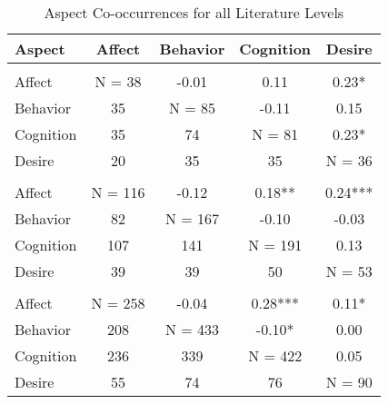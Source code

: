 \begin{table}
\begin{minipage}[t][\textheight][t]{\textwidth}

\caption{\label{tab:CombinedCooccurrences}Aspect Co-occurrences for all Literature Levels}
\begin{tabular}[t]{lcccc}
\toprule
Aspect & Affect & Behavior & Cognition & Desire\\
\midrule
\addlinespace[0.3em]
\multicolumn{5}{l}{\textbf{Theoretical}}\\
\hspace{1em}Affect & N = 38 & -0.01 & 0.11 & 0.23*\\
\hspace{1em}Behavior & 35 & N = 85 & -0.11 & 0.15\\
\hspace{1em}Cognition & 35 & 74 & N = 81 & 0.23*\\
\hspace{1em}Desire & 20 & 35 & 35 & N = 36\\
\addlinespace[0.3em]
\multicolumn{5}{l}{\textbf{Methodological}}\\
\hspace{1em}Affect & N = 116 & -0.12 & 0.18** & 0.24***\\
\hspace{1em}Behavior & 82 & N = 167 & -0.10 & -0.03\\
\hspace{1em}Cognition & 107 & 141 & N = 191 & 0.13\\
\hspace{1em}Desire & 39 & 39 & 50 & N = 53\\
\addlinespace[0.3em]
\multicolumn{5}{l}{\textbf{Empirical}}\\
\hspace{1em}Affect & N = 258 & -0.04 & 0.28*** & 0.11*\\
\hspace{1em}Behavior & 208 & N = 433 & -0.10* & 0.00\\
\hspace{1em}Cognition & 236 & 339 & N = 422 & 0.05\\
\hspace{1em}Desire & 55 & 74 & 76 & N = 90\\
\bottomrule
\end{tabular}
\end{minipage}
\end{table}
